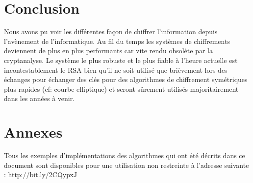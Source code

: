 \chapter*{Conclusion}
Nous avons pu voir les différentes façon de chiffrer l'information depuis l'avènement de l'informatique. Au fil du temps les systèmes de chiffrements deviennent de plus en plus performants car vite rendu obsolète par la cryptanalyse. Le système le plus robuste et le plus fiable à l'heure actuelle est incontestablement le RSA bien qu'il ne soit utilisé que brièvement lors des échanges pour échanger des clés pour des algorithmes de chiffrement symétriques plus rapides (cf: courbe elliptique) et seront sûrement utilisés majoritairement dans les années à venir.
\chapter*{Annexes}
Tous les exemples d'implémentations des algorithmes qui ont été décrits dans ce document sont disponibles pour une utilisation non restreinte à l'adresse suivante : http://bit.ly/2CQypxJ
